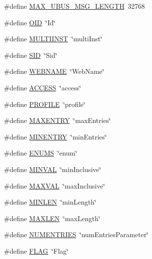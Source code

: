 \begin{DoxyCompactItemize}
\item 
\#define \hyperlink{group__LIBHELP_gaf80cdd55bad5558a63bbfc6fadd3c665}{M\-A\-X\-\_\-\-U\-B\-U\-S\-\_\-\-M\-S\-G\-\_\-\-L\-E\-N\-G\-T\-H}~32768
\item 
\#define \hyperlink{group__LIBHELP_gab0602f28920b31b2015535b1a8c159e3}{O\-I\-D}~\char`\"{}Id\char`\"{}
\item 
\#define \hyperlink{group__LIBHELP_ga986e1b45ade6c34d0d399c08b933da6b}{M\-U\-L\-T\-I\-I\-N\-S\-T}~\char`\"{}multi\-Inst\char`\"{}
\item 
\#define \hyperlink{group__LIBHELP_ga7b7a6526ee4fc05f1bdd0f05079754d9}{S\-I\-D}~\char`\"{}Sid\char`\"{}
\item 
\#define \hyperlink{group__LIBHELP_gafcd28ee5da68f58dfda7b7d033fb9cfc}{W\-E\-B\-N\-A\-M\-E}~\char`\"{}Web\-Name\char`\"{}
\item 
\#define \hyperlink{group__LIBHELP_ga321a20f839f3d9ccd0db1dc865850dc7}{A\-C\-C\-E\-S\-S}~\char`\"{}access\char`\"{}
\item 
\#define \hyperlink{group__LIBHELP_ga84122cc8fb20a83dda3ef92cf3286740}{P\-R\-O\-F\-I\-L\-E}~\char`\"{}profile\char`\"{}
\item 
\#define \hyperlink{group__LIBHELP_ga7dd186f2b30361953627365015ba5120}{M\-A\-X\-E\-N\-T\-R\-Y}~\char`\"{}max\-Entries\char`\"{}
\item 
\#define \hyperlink{group__LIBHELP_gac1e659c7aee7cd9099fc5d464169537c}{M\-I\-N\-E\-N\-T\-R\-Y}~\char`\"{}min\-Entries\char`\"{}
\item 
\#define \hyperlink{group__LIBHELP_gaea5b29a8b32c473873eec73a683aeae0}{E\-N\-U\-M\-S}~\char`\"{}enum\char`\"{}
\item 
\#define \hyperlink{group__LIBHELP_ga80b22c555ddadb47cc6ca338a9c49126}{M\-I\-N\-V\-A\-L}~\char`\"{}min\-Inclusive\char`\"{}
\item 
\#define \hyperlink{group__LIBHELP_gac7129ccaa762fa4c6b07733faa0a16e0}{M\-A\-X\-V\-A\-L}~\char`\"{}max\-Inclusive\char`\"{}
\item 
\#define \hyperlink{group__LIBHELP_ga0074b0744e9b1a16324c1e3a04b2d234}{M\-I\-N\-L\-E\-N}~\char`\"{}min\-Length\char`\"{}
\item 
\#define \hyperlink{group__LIBHELP_gae6648cd71a8bd49d58ae8ed33ba910d1}{M\-A\-X\-L\-E\-N}~\char`\"{}max\-Length\char`\"{}
\item 
\#define \hyperlink{group__LIBHELP_gafd1cbca7b088074f9c04a5d08f3b4ee2}{N\-U\-M\-E\-N\-T\-R\-I\-E\-S}~\char`\"{}num\-Entries\-Parameter\char`\"{}
\item 
\#define \hyperlink{group__LIBHELP_gaf8bfae90c5d6853fcfb487e05b9f50c8}{F\-L\-A\-G}~\char`\"{}Flag\char`\"{}

\end{DoxyCompactItemize}
